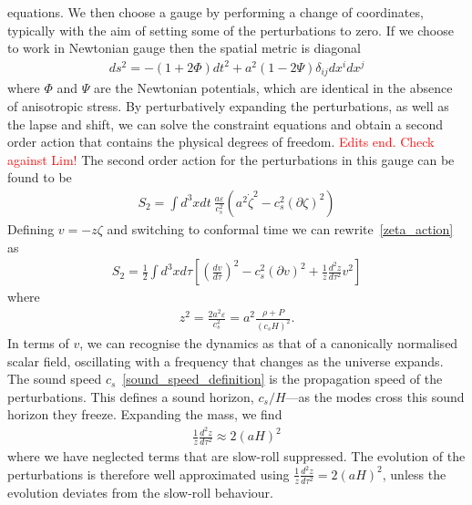     equations.
    We then choose a gauge by performing a change of coordinates, typically with
    the aim of setting some of the perturbations to zero.
    If we choose to work in Newtonian gauge then the spatial metric is diagonal
    \begin{align}\label{newtonian_metric}
        ds^2 = -(1+2\Phi)dt^2+a^2(1-2\Psi)\delta_{ij}dx^idx^j
    \end{align}
    where $\Phi$ and $\Psi$ are the Newtonian potentials, which are identical
    in the absence of anisotropic stress.
    By perturbatively expanding the perturbations, as well as the lapse and shift,
    we can solve the constraint equations and obtain a second order action that contains
    the physical degrees of freedom.
    \textcolor{red}{Edits end. Check against Lim!}
    The second order action for the perturbations in this gauge can be found to be
    \begin{align}\label{zeta_action}
        S_{2} = \int d^3x dt~\frac{a\varepsilon}{c_s^2}\left(a^2\dot{\zeta}^2-c_s^2\left(\partial\zeta\right)^2\right)
    \end{align}
    Defining $v=-z\zeta$ and switching to conformal time we can rewrite~\eqref{zeta_action} as
    \begin{align}\label{v_action}
        S_{2} = \frac{1}{2}\int d^3x d\tau \left[{\left(\frac{d v}{d \tau}\right)}^2-c_s^2\left(\partial v\right)^2+\frac{1}{z}\frac{d^2z}{d\tau^2}v^2\right]
    \end{align}
    where
    \begin{align}\label{z_defn}
        z^2 = \frac{2a^2\varepsilon}{c_s^2} = a^2\frac{\rho+P}{\left(c_sH\right)^2}.
    \end{align}
    In terms of $v$, we can recognise the dynamics as that of a
    canonically normalised scalar field, oscillating
    with a frequency that changes as the universe expands.
    The sound speed $c_s$~\eqref{sound_speed_definition} is
    the propagation speed of the perturbations.
    This defines a sound horizon, $c_s/H$---as the modes cross this sound
    horizon they freeze.
    Expanding the mass, we find
    \begin{align}
        \frac{1}{z}\frac{d^2z}{d\tau^2} \approx 2{\left(aH\right)}^2
    \end{align}
    where we have neglected terms that are slow-roll suppressed.
    The evolution of the perturbations is therefore well approximated using
    $\frac{1}{z}\frac{d^2z}{d\tau^2} = 2{\left(aH\right)}^2$,
    unless the evolution deviates from the slow-roll behaviour.

